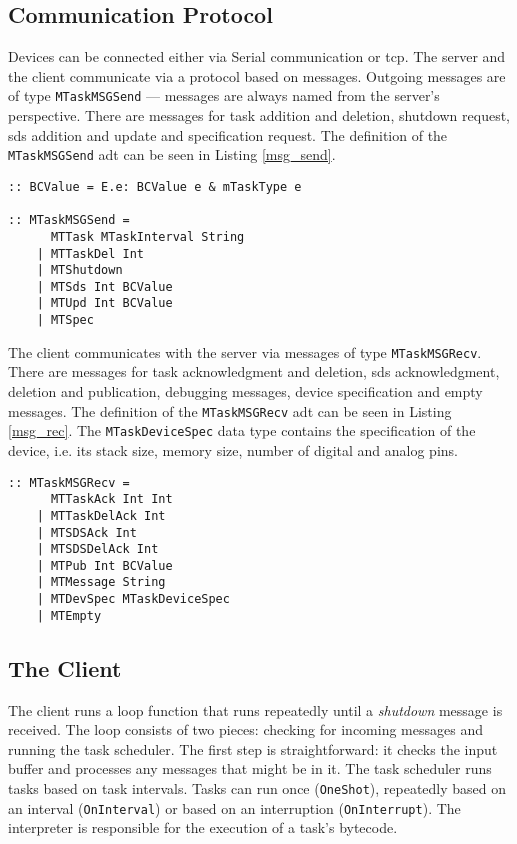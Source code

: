 \subsection{Communication Protocol}\label{sec:mtask_com_prot}

Devices can be connected either via Serial communication or \acs{tcp}. The server and the client communicate via a protocol based on messages. Outgoing messages are of type \texttt{MTaskMSGSend} --- messages are always named from the server's perspective. There are messages for task addition and deletion, shutdown request, \ac{sds} addition and update and specification request. The definition of the \texttt{MTaskMSGSend} \ac{adt} can be seen in Listing \ref{msg_send}.

\begin{lstlisting}[caption=Communication protocol: sent messages,captionpos=b,label=msg_send]
:: BCValue = E.e: BCValue e & mTaskType e

:: MTaskMSGSend = 
      MTTask MTaskInterval String
    | MTTaskDel Int
    | MTShutdown
    | MTSds Int BCValue
    | MTUpd Int BCValue
    | MTSpec
\end{lstlisting}

The client communicates with the server via messages of type \texttt{MTaskMSGRecv}. There are messages for task acknowledgment and deletion, \ac{sds} acknowledgment, deletion and publication, debugging messages, device specification and empty messages. The definition of the \texttt{MTaskMSGRecv} \ac{adt} can be seen in Listing \ref{msg_rec}. The \texttt{MTaskDeviceSpec} data type contains the specification of the device, i.e. its stack size, memory size, number of digital and analog pins.

\begin{lstlisting}[caption=Communication protocol: received messages,captionpos=b,label=msg_rec]
:: MTaskMSGRecv = 
      MTTaskAck Int Int
    | MTTaskDelAck Int
    | MTSDSAck Int
    | MTSDSDelAck Int
    | MTPub Int BCValue
    | MTMessage String
    | MTDevSpec MTaskDeviceSpec
    | MTEmpty
\end{lstlisting}

\subsection{The Client}

The client runs a loop function that runs repeatedly until a \textit{shutdown} message is received. The loop consists of two pieces: checking for incoming messages and running the task scheduler. The first step is straightforward: it checks the input buffer and processes any messages that might be in it. The task scheduler runs tasks based on task intervals. Tasks can run once (\texttt{OneShot}), repeatedly based on an interval (\texttt{OnInterval}) or based on an interruption (\texttt{OnInterrupt}). The interpreter is responsible for the execution of a task's bytecode.

